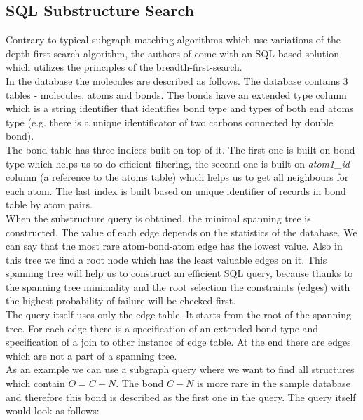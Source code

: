 \subsection{SQL Substructure Search}

Contrary to typical subgraph matching algorithms which use variations of the depth-first-search algorithm, the authors of \cite{SQL} come with an SQL based solution which utilizes the principles of the breadth-first-search.\\

In the database the molecules are described as follows. The database contains 3 tables - molecules, atoms and bonds. The bonds have an extended type column which is a string identifier that identifies bond type and types of both end atoms type (e.g. there is a unique identificator of two carbons connected by double bond).\\

The bond table has three indices built on top of it. The first one is built on bond type which helps us to do efficient filtering, the second one is built on \textit{atom1\_id} column (a reference to the atoms table) which helps us to get all neighbours for each atom. The last index is built based on unique identifier of records in bond table by atom pairs.\\

When the substructure query is obtained, the minimal spanning tree is constructed. The value of each edge depends on the statistics of the database. We can say that the most rare atom-bond-atom edge has the lowest value. Also in this tree we find a root node which has the least valuable edges on it. This spanning tree will help us to construct an efficient SQL query, because thanks to the spanning tree minimality and the root selection the constraints (edges) with the highest probability of failure will be checked first.\\

The query itself uses only the edge table. It starts from the root of the spanning tree. For each edge there is a specification of an extended bond type and specification of a join to other instance of edge table. At the end there are edges which are not a part of a spanning tree.\\

As an example we can use a subgraph query where we want to find all structures which contain $ O=C-N $. The bond $ C-N $ is more rare in the sample database and therefore this bond is described as the first one in the query. The query itself would look as follows:


